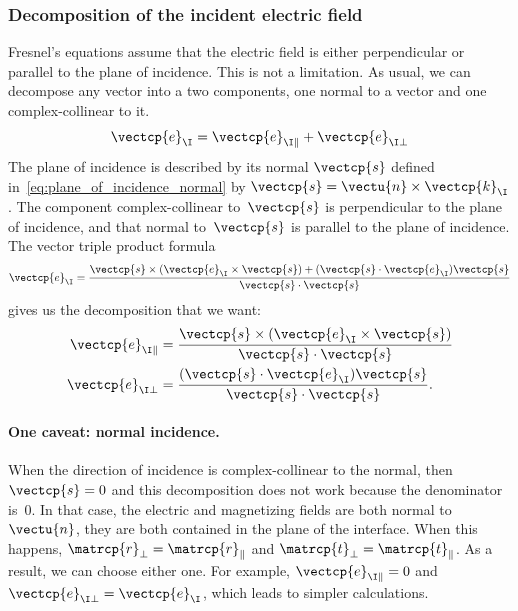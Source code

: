 \subsubsection{Decomposition of the incident electric field}
\label{sec:decomposition_para_perp}
Fresnel's equations assume that the electric field is either perpendicular or parallel to the plane of incidence.
This is not a limitation.
As usual, we can decompose any vector into a two components, one normal to a vector and one complex-collinear to it.
\begin{equation}
    \vectcp{e}_\I = \vectcp{e}_{\I \parallel} + \vectcp{e}_{\I \perp}
\end{equation}
The plane of incidence is described by its normal $\vectcp{s}$ defined in~\cref{eq:plane_of_incidence_normal} by $\vectcp{s} = \vectu{n} \times \vectcp{k}_\I$.
The component complex-collinear to~$\vectcp{s}$ is perpendicular to the plane of incidence, and that normal to~$\vectcp{s}$ is parallel to the plane of incidence.
The vector triple product formula
\begin{equation}
    \vectcp{e}_\I =
    \frac{
        \vectcp{s} \times (\vectcp{e}_\I \times \vectcp{s})
        +
        (\vectcp{s} \cdot \vectcp{e}_\I) \vectcp{s}
    }{
        \vectcp{s} \cdot \vectcp{s}
    }
\end{equation}
gives us the decomposition that we want:
\begin{subequations}    
    \begin{align}
        \vectcp{e}_{\I \parallel}
        &=
        \frac{
            \vectcp{s} \times (\vectcp{e}_\I \times \vectcp{s})
        }{
            \vectcp{s} \cdot \vectcp{s}
        }
        \\
        \vectcp{e}_{\I \perp}
        &=
        \frac{
            (\vectcp{s} \cdot \vectcp{e}_\I) \vectcp{s}
        }{
            \vectcp{s} \cdot \vectcp{s}
        }
        \text{.}
    \end{align}
\end{subequations}

\paragraph{One caveat: normal incidence.}
\label{sec:fresnel_normal_incidence}
When the direction of incidence is complex-collinear to the normal, then 
$\vectcp{s}=0$ and this decomposition does not work because the denominator is~0.
In that case, the electric and magnetizing fields are both normal to~$\vectu{n}$, they are both contained in the plane of the interface.
When this happens, $\matrcp{r}_\perp = \matrcp{r}_\parallel$ and $\matrcp{t}_\perp = \matrcp{t}_\parallel$.
As a result, we can choose either one.
For example, $\vectcp{e}_{\I \parallel} = 0$ and $\vectcp{e}_{\I \perp}=\vectcp{e}_\I$, which leads to simpler calculations.

